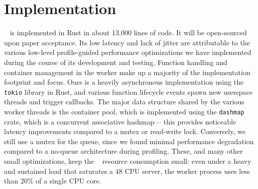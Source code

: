 \section{Implementation}
\label{sec:impl}


\sysname~ is implemented in Rust in about 13,000 lines of code.
It will be open-sourced upon paper acceptance. 
Its low latency and lack of jitter are attributable to the various low-level profile-guided performance optimizations we have implemented during the course of its development and testing.
Function handling and container management in the worker make up a majority of the implementation footprint and focus. 
Ours is a heavily asynchronous implementation using the \texttt{tokio} library in Rust, and various function lifecycle events spawn new userspace threads and trigger callbacks. 
The major data structure shared by the various worker threads is the container pool, which is implemented using the \texttt{dashmap} crate, which is a concurrent associative hashmap--- this provides noticeable latency improvements compared to a mutex or read-write lock.
Conversely, we still use a mutex for the queue, since we found minimal performance degradation compared to a no-queue architecture during profiling. 
These, and many other small optimizations, keep the \sysname~
resource consumption small: even under a heavy and sustained load that saturates a 48 CPU server, the worker process uses less than 20\% of a single CPU core. 








